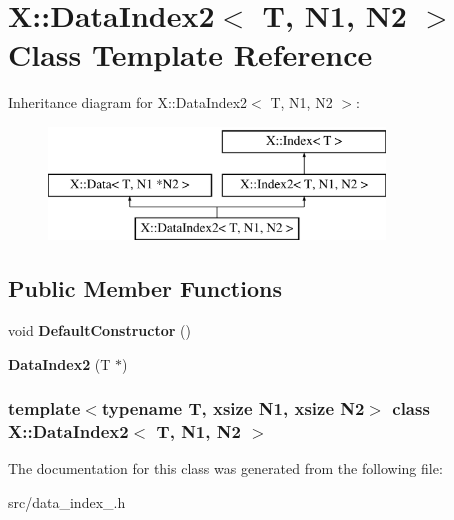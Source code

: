 \hypertarget{class_x_1_1_data_index2}{\section{X\-:\-:Data\-Index2$<$ T, N1, N2 $>$ Class Template Reference}
\label{class_x_1_1_data_index2}
}
Inheritance diagram for X\-:\-:Data\-Index2$<$ T, N1, N2 $>$\-:\begin{figure}[H]
\begin{center}
\leavevmode
\includegraphics[height=3.000000cm]{class_x_1_1_data_index2}
\end{center}
\end{figure}
\subsection*{Public Member Functions}
\begin{DoxyCompactItemize}
\item 
\hypertarget{class_x_1_1_data_index2_a25805f76116adcea21754503f42ac30f}{void {\bfseries Default\-Constructor} ()}\label{class_x_1_1_data_index2_a25805f76116adcea21754503f42ac30f}

\item 
\hypertarget{class_x_1_1_data_index2_a23b362365b1115b5e922ee50ca026c28}{{\bfseries Data\-Index2} (T $\ast$)}\label{class_x_1_1_data_index2_a23b362365b1115b5e922ee50ca026c28}

\end{DoxyCompactItemize}
\subsubsection*{template$<$typename T, xsize N1, xsize N2$>$ class X\-::\-Data\-Index2$<$ T, N1, N2 $>$}



The documentation for this class was generated from the following file\-:\begin{DoxyCompactItemize}
\item 
src/data\-\_\-index\-\_.\-h\end{DoxyCompactItemize}

